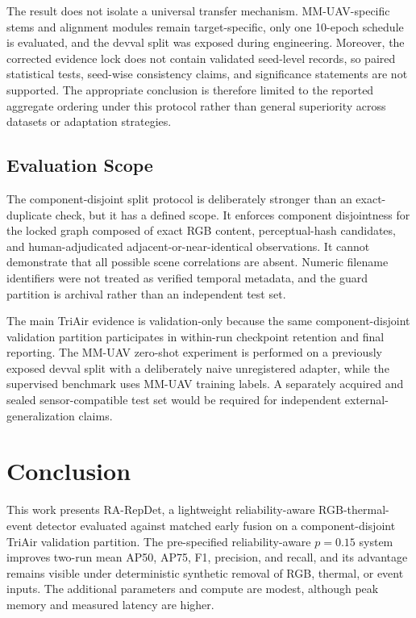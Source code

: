 The result does not isolate a universal transfer mechanism. MM-UAV-specific stems and alignment modules remain target-specific, only one 10-epoch schedule is evaluated, and the devval split was exposed during engineering. Moreover, the corrected evidence lock does not contain validated seed-level records, so paired statistical tests, seed-wise consistency claims, and significance statements are not supported. The appropriate conclusion is therefore limited to the reported aggregate ordering under this protocol rather than general superiority across datasets or adaptation strategies.

\subsection{Evaluation Scope}
The component-disjoint split protocol is deliberately stronger than an exact-duplicate check, but it has a defined scope. It enforces component disjointness for the locked graph composed of exact RGB content, perceptual-hash candidates, and human-adjudicated adjacent-or-near-identical observations. It cannot demonstrate that all possible scene correlations are absent. Numeric filename identifiers were not treated as verified temporal metadata, and the guard partition is archival rather than an independent test set.

The main TriAir evidence is validation-only because the same component-disjoint validation partition participates in within-run checkpoint retention and final reporting. The MM-UAV zero-shot experiment is performed on a previously exposed devval split with a deliberately naive unregistered adapter, while the supervised benchmark uses MM-UAV training labels. A separately acquired and sealed sensor-compatible test set would be required for independent external-generalization claims.

\section{Conclusion}
This work presents RA-RepDet, a lightweight reliability-aware RGB-thermal-event detector evaluated against matched early fusion on a component-disjoint TriAir validation partition. The pre-specified reliability-aware $p=0.15$ system improves two-run mean AP50, AP75, F1, precision, and recall, and its advantage remains visible under deterministic synthetic removal of RGB, thermal, or event inputs. The additional parameters and compute are modest, although peak memory and measured latency are higher.

